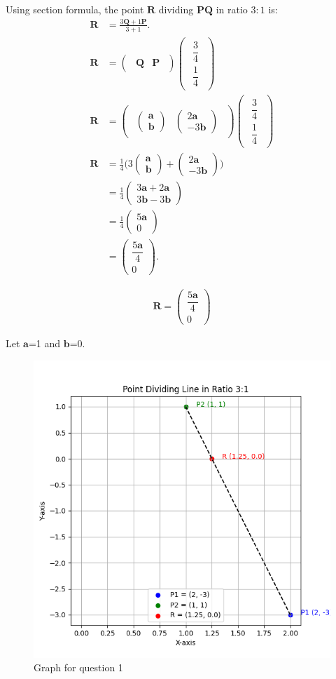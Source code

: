 \documentclass[journal]{IEEEtran}
\renewcommand{\vec}[1]{\mathbf{#1}}
\newcommand{\brak}[1]{\begin{pmatrix}#1\end{pmatrix}}
\begin{document}
Using section formula, the point $\vec{R}$ dividing $\vec{PQ}$ in ratio $3:1$ is:
\begin{align}
\vec{R} &= \frac{3\vec{Q} + 1\vec{P}}{3+1}. \\[6pt]
\vec{R} &= \brak{\begin{matrix}\vec{Q} & \vec{P}\end{matrix}}
          \brak{\begin{matrix}\dfrac{3}{4} \\[6pt]\dfrac{1}{4}\end{matrix}} \\[6pt]
\vec{R} &= \brak{\begin{matrix}\brak{\vec{a} \\ \vec{b}} & \brak{2\vec{a} \\ -3\vec{b}}\end{matrix}}
          \brak{\begin{matrix}\dfrac{3}{4} \\[6pt]\dfrac{1}{4}\end{matrix}} \\[6pt]
\vec{R} &= \frac{1}{4}\Big(3\brak{\vec{a} \\ \vec{b}} + \brak{2\vec{a} \\ -3\vec{b}}\Big) \\[6pt]
&= \frac{1}{4}\brak{3\vec{a}+2\vec{a} \\ 3\vec{b}-3\vec{b}} \\[6pt]
&= \frac{1}{4}\brak{5\vec{a} \\ 0} \\[6pt]
&= \brak{\dfrac{5\vec{a}}{4} \\ 0}.
\end{align}

\begin{align}
\boxed{\,\vec{R} = \brak{\dfrac{5\vec{a}}{4} \\ 0}\,}
\end{align}


Let $\vec{a}$=1 and $\vec{b}$=0.

\begin{figure}[ht!]
\centering
\includegraphics[height=0.5\textheight, keepaspectratio]{figs/q1.png}
\caption{Graph for question 1}
\end{figure}
\end{document}
